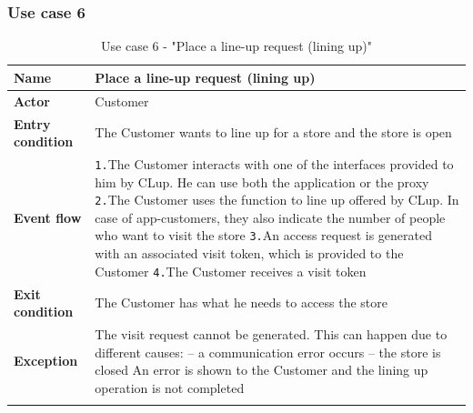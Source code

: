 \documentclass[a4paper,oneside,11pt]{book}   %
\begin{document}
    \subsubsection{Use case 6}
    \begin{longtable}[c] { |>{\bfseries{}}C{0.25\textwidth}|V{0.55\textwidth}| }
        \hline
        Name            & Place a line-up request (lining up) \\ \hline
        Actor           & Customer \\ \hline
        Entry condition & The Customer wants to line up for a store and the store is open \\ \hline
        Event flow      & 
        \texttt{1.}The Customer interacts with one of the interfaces provided to him by CLup. He can use both the application or the proxy \newline
        \texttt{2.}The Customer uses the function to line up offered by CLup. In case of app-customers, they also indicate the number of people who want to visit the store \newline
        \texttt{3.}An access request is generated with an associated visit token, which is provided to the Customer \newline 
        \texttt{4.}The Customer receives a visit token \\ \hline
        Exit condition  & The Customer has what he needs to access the store \\ \hline
        Exception       & The visit request cannot be generated. This can happen due to different causes: \newline
        -- a communication error occurs \newline
        -- the store is closed \newline
        An error is shown to the Customer and the lining up operation is not completed \\
        \hline
    \caption{Use case 6 - "Place a line-up request (lining up)"}
    \label{table:use_case_06}
    \end{longtable}
    
\end{document}
